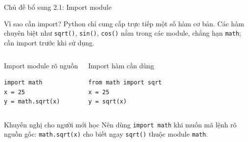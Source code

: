 \documentclass[aspectratio=169,10pt]{beamer}
\begin{document}

\begin{frame}[fragile]{Chủ đề bổ sung 2.1: Import module}
\small
\begin{block}{Vì sao cần import?}
Python chỉ cung cấp trực tiếp một số hàm cơ bản. Các hàm chuyên biệt như \texttt{sqrt()}, \texttt{sin()}, \texttt{cos()} nằm trong các module, chẳng hạn \texttt{math}; cần import trước khi sử dụng.
\end{block}
\vspace{0.18cm}
\begin{columns}[T,onlytextwidth]
\begin{exampleblock}{Import module rõ nguồn}
\begin{lstlisting}
import math
x = 25
y = math.sqrt(x)
\end{lstlisting}
\end{exampleblock}
\begin{exampleblock}{Import hàm cần dùng}
\begin{lstlisting}
from math import sqrt
x = 25
y = sqrt(x)
\end{lstlisting}
\end{exampleblock}
\end{columns}
\vspace{0.2cm}
\begin{alertblock}{Khuyến nghị cho người mới học}
Nên dùng \texttt{import math} khi muốn mã lệnh rõ nguồn gốc: \texttt{math.sqrt(x)} cho biết ngay \texttt{sqrt()} thuộc module \texttt{math}.
\end{alertblock}
\end{frame}
\end{document}
